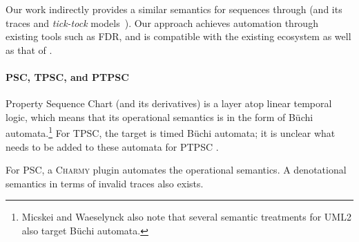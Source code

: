 Our work indirectly provides a similar semantics for \langname{}
sequences through \tockcsp{} (and its traces and \emph{tick-tock} models~\cite{Baxter21-TickTock}).
Our approach achieves automation through existing tools such as FDR,
and is compatible with the existing \robostar{} ecosystem as well as that of
\tockcsp.

\paragraph{PSC, TPSC, and PTPSC}

Property Sequence Chart (and its derivatives) is a layer atop
linear temporal logic, which means that its operational semantics is
in the form of B\"uchi automata.\footnote{
Micskei and Waeselynck also note that several semantic treatments for UML2 also
target B\"uchi automata.}
For TPSC, the target is timed B\"uchi
automata; it is unclear what needs to be added to these automata for PTPSC .


For PSC, a \textsc{Charmy} plugin automates the operational semantics.  A denotational semantics in terms of
invalid traces also exists.